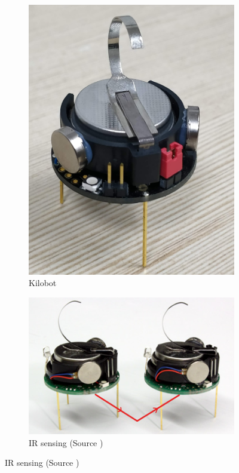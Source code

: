 \begin{figure}[H]
	\begin{subfigure}{0.45\textwidth}
		\centering
		\includegraphics[scale=0.04]{images/kilobots}
		\caption{Kilobot}
		\label{fig:kilobot}
	\end{subfigure}
	\begin{subfigure}{0.45\textwidth}
		\centering
		\includegraphics[scale=0.5]{images/comm}
		\caption{IR sensing (Source \cite{kilobotics_manual})}
        \label{fig:comm}
	\end{subfigure}
\end{figure}

